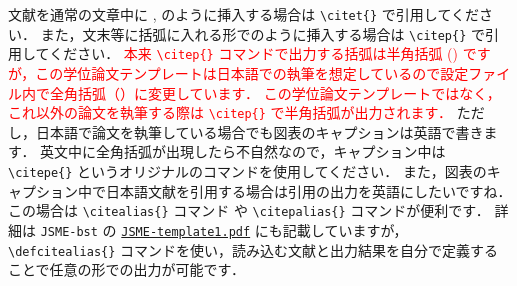 文献を通常の文章中に \citet{Matsukawa:PoF2022}, \citet{松川:流力年会2022} のように挿入する場合は \verb|\citet{}| で引用してください．
また，文末等に括弧に入れる形で\citep{Matsukawa:PoF2022,松川:流力年会2022}のように挿入する場合は \verb|\citep{}| で引用してください．
\textcolor{red}{本来 \texttt{\textbackslash citep\{\}} コマンドで出力する括弧は半角括弧 () ですが，この学位論文テンプレートは日本語での執筆を想定しているので設定ファイル内で全角括弧（）に変更しています．
この学位論文テンプレートではなく，これ以外の論文を執筆する際は \texttt{\textbackslash citep\{\}} で半角括弧が出力されます．}
ただし，日本語で論文を執筆している場合でも図表のキャプションは英語で書きます．
英文中に全角括弧が出現したら不自然なので，キャプション中は \verb|\citepe{}| というオリジナルのコマンドを使用してください．
また，図表のキャプション中で日本語文献を引用する場合は引用の出力を英語にしたいですね．
この場合は \verb|\citealias{}| コマンド や \verb|\citepalias{}| コマンドが便利です．
詳細は \verb|JSME-bst| の \href{https://github.com/Yuki-MATSUKAWA/JSME-bst/blob/main/JSME-template1.pdf}{\texttt{JSME-template1.pdf}} にも記載していますが，\verb|\defcitealias{}| コマンドを使い，読み込む文献と出力結果を自分で定義することで任意の形での出力が可能です．



